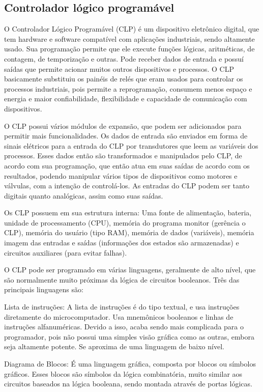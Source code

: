 \documentclass{article}
\begin{document}
\subsection{Controlador lógico programável}

O Controlador Lógico Programável (CLP) é um dispositivo eletrônico digital, que tem hardware e software compatível com aplicações industriais, sendo altamente usado. Sua programação permite que ele execute funções lógicas, aritméticas, de contagem, de temporização e outras. Pode receber dados de entrada e possuí saídas que permite acionar muitos outros dispositivos e processos. O CLP basicamente substituiu os painéis de relés que eram usados para controlar os processos industriais, pois permite a reprogramação, consumem menos espaço e energia e maior confiabilidade, flexibilidade e capacidade de comunicação com dispositivos. 

O CLP possui vários módulos de expansão, que podem ser adicionados para permitir mais funcionalidades. Os dados de entrada são enviados em forma de sinais elétricos para a entrada do CLP por transdutores que leem as variáveis dos processos. Esses dados então são transformados e manipulados pelo CLP, de acordo com sua programação, que então atua em suas saídas de acordo com os resultados, podendo manipular vários tipos de dispositivos como motores e válvulas, com a intenção de controlá-los. As entradas do CLP podem ser tanto digitais quanto analógicas, assim como suas saídas. 

Os CLP possuem em sua estrutura interna: Uma fonte de alimentação, bateria, unidade de processamento (CPU), memória do programa monitor (gerência o CLP), memória do usuário (tipo RAM), memória de dados (variáveis), memória imagem das entradas e saídas (informações dos estados são armazenadas) e circuitos auxiliares (para evitar falhas). 

O CLP pode ser programado em várias linguagens, geralmente de alto nível, que são normalmente muito próximas da lógica de circuitos booleanos. Três das principais linguagens são: 

Lista de instruções: A lista de instruções é do tipo textual, e usa instruções diretamente do microcomputador. Usa mnemônicos booleanos e linhas de instruções alfanuméricas. Devido a isso, acaba sendo mais complicada para o programador, pois não possui uma simples visão gráfica como as outras, embora seja altamente potente. Se aproxima de uma linguagem de baixo nível. 

Diagrama de Blocos: É uma linguagem gráfica, composta por blocos ou símbolos gráficos. Esses blocos são símbolos da lógica combinatória, muito similar aos circuitos baseados na lógica booleana, sendo montada através de portas lógicas. 
\end{document}
